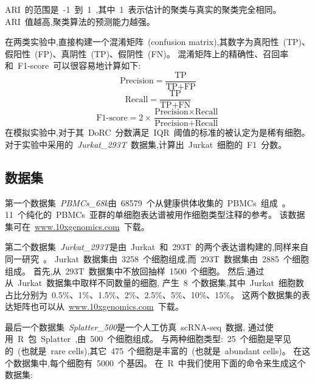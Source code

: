 ARI~的范围是~-1~到~1~,其中~1~表示估计的聚类与真实的聚类完全相同。
ARI~值越高,聚类算法的预测能力越强。

在两类实验中,直接构建一个混淆矩阵~(confusion matrix),其数字为真阳性~(TP)、假阳性~(FP)、真阴性~(TP)、假阴性~(FN)。
混淆矩阵上的精确性、召回率和~F1-score~可以很容易地计算如下:
\begin{equation}
    \label{eq:precision}
    \text{Precision} = \frac{\text{TP}}{\text{TP} + \text{FP}}
\end{equation}
\begin{equation}
    \label{eq:recall}
    \text{Recall} = \frac{\text{TP}}{\text{TP} + \text{FN}}
\end{equation}
\begin{equation}
\label{eq:f1score}
\text{F1-score} = 2 \times \frac{\text{Precision} \times \text{Recall}}{ \text{Precision} + \text{Recall}}
\end{equation}
在模拟实验中,对于其~DoRC~分数满足~IQR~阈值的标准的被认定为是稀有细胞。
对于实验中采用的~\textit{Jurkat\_293T}~数据集,计算出~Jurkat~细胞的~F1~分数。

\subsection{数据集}
\label{subsec:datasets} 

第一个数据集~\textit{PBMCs\_68k}由~68579~个从健康供体收集的~PBMCs~组成~\cite{zheng2017massively}。
11~个纯化的~PBMCs~亚群的单细胞表达谱被用作细胞类型注释的参考。
该数据集可在~\url{www.10xgenomics.com}~下载。


第二个数据集~\textit{Jurkat\_293T}是由~Jurkat~和~293T~的两个表达谱构建的,同样来自同一研究~\cite{zheng2017massively}。
Jurkat~数据集由~3258~个细胞组成,而~293T~数据集由~2885~个细胞组成。
首先,从~293T~数据集中不放回抽样~1500~个细胞。
然后,通过从~Jurkat~数据集中取样不同数量的细胞,
产生~8~个数据集,其中~Jurkat~细胞数占比分别为~0.5\%、1\%、1.5\%、2\%、2.5\%、5\%、10\%、15\%。
这两个数据集的表达矩阵也可以从~\url{www.10xgenomics.com}~下载。

最后一个数据集~\textit{Splatter\_500}是一个人工仿真~scRNA-seq~数据,
通过使用~R~包~Splatter~\cite{zappia2017splatter},由~500~个细胞组成。
与两种细胞类型:~25~个细胞是罕见的~(也就是~rare cells),其它~475~个细胞是丰富的~(也就是~abundant cells)。
在这个数据集中,每个细胞有~5000~个基因。
在~R~中我们使用下面的命令来生成这个数据集:

